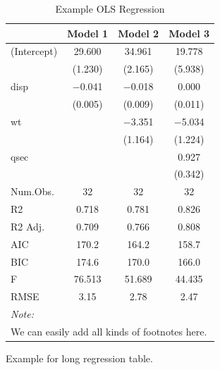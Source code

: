 \documentclass[
  12pt,
]{article}
\begin{document}
\begin{table}

\caption{\label{tab:example-table}Example OLS Regression}
\centering
\begin{tabular}[t]{lccc}
\toprule
  & Model 1 & Model 2 & Model 3\\
\midrule
(Intercept) & \num{29.600} & \num{34.961} & \num{19.778}\\
 & (\num{1.230}) & (\num{2.165}) & (\num{5.938})\\
disp & \num{-0.041} & \num{-0.018} & \num{0.000}\\
 & (\num{0.005}) & (\num{0.009}) & (\num{0.011})\\
wt &  & \num{-3.351} & \num{-5.034}\\
 &  & (\num{1.164}) & (\num{1.224})\\
qsec &  &  & \num{0.927}\\
 &  &  & (\num{0.342})\\
\midrule
Num.Obs. & \num{32} & \num{32} & \num{32}\\
R2 & \num{0.718} & \num{0.781} & \num{0.826}\\
R2 Adj. & \num{0.709} & \num{0.766} & \num{0.808}\\
AIC & \num{170.2} & \num{164.2} & \num{158.7}\\
BIC & \num{174.6} & \num{170.0} & \num{166.0}\\
F & \num{76.513} & \num{51.689} & \num{44.435}\\
RMSE & \num{3.15} & \num{2.78} & \num{2.47}\\
\bottomrule
\multicolumn{4}{l}{\rule{0pt}{1em}\textit{Note: }}\\
\multicolumn{4}{l}{\rule{0pt}{1em}We can easily add all kinds of footnotes here.}\\
\end{tabular}
\end{table}

Example for long regression table.
\end{document}

